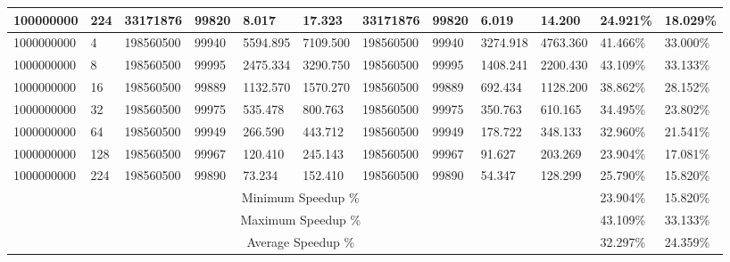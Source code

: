 \begin{tabular}{|l|l|l|l|l|l|l|l|l|l|l|l| }
100000000 &  224 & 33171876 & 99820 & 8.017& 17.323& 33171876 & 99820 & 6.019& 14.200 & 24.921\% & 18.029\% \\ \hline 
1000000000 &  4 & 198560500 & 99940 & 5594.895& 7109.500& 198560500 & 99940 & 3274.918& 4763.360 & 41.466\% & 33.000\% \\ \hline 
1000000000 &  8 & 198560500 & 99995 & 2475.334& 3290.750& 198560500 & 99995 & 1408.241& 2200.430 & 43.109\% & 33.133\% \\ \hline 
1000000000 &  16 & 198560500 & 99889 & 1132.570& 1570.270& 198560500 & 99889 & 692.434& 1128.200 & 38.862\% & 28.152\% \\ \hline 
1000000000 &  32 & 198560500 & 99975 & 535.478& 800.763& 198560500 & 99975 & 350.763& 610.165 & 34.495\% & 23.802\% \\ \hline 
1000000000 &  64 & 198560500 & 99949 & 266.590& 443.712& 198560500 & 99949 & 178.722& 348.133 & 32.960\% & 21.541\% \\ \hline 
1000000000 &  128 & 198560500 & 99967 & 120.410& 245.143& 198560500 & 99967 & 91.627& 203.269 & 23.904\% & 17.081\% \\ \hline 
1000000000 &  224 & 198560500 & 99890 & 73.234& 152.410& 198560500 & 99890 & 54.347& 128.299 & 25.790\% & 15.820\% \\ \hline 
\hline
\multicolumn{10}{|c|}{Minimum Speedup \%} & 23.904\% & 15.820\% \\ 
\hline
\multicolumn{10}{|c|}{Maximum Speedup \%} & 43.109\% & 33.133\% \\ \hline 
\hline
\multicolumn{10}{|c|}{Average Speedup \%} & 32.297\% & 24.359\% \\ \hline 
\end{tabular}
